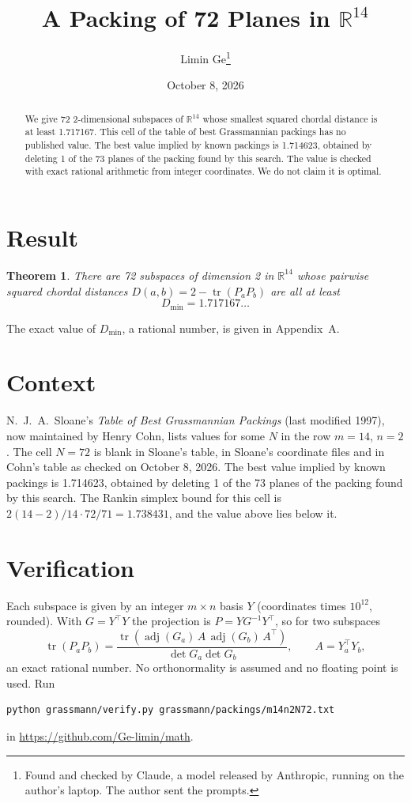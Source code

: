 \documentclass[11pt,a4paper]{article}
\title{A Packing of 72 Planes in $\mathbb{R}^{14}$}
\author{Limin Ge\thanks{Found and checked by Claude, a model released by Anthropic, running on the author's laptop. The author sent the prompts.}}
\date{October 8, 2026}
\newtheorem*{theorem}{Theorem}
\begin{document}
\maketitle
\begin{abstract}
We give 72 2-dimensional subspaces of $\mathbb{R}^{14}$ whose smallest squared chordal distance is at least 1.717167. This cell of the table of best Grassmannian packings has no published value. The best value implied by known packings is 1.714623, obtained by deleting 1 of the 73 planes of the packing found by this search. The value is checked with exact rational arithmetic from integer coordinates. We do not claim it is optimal.
\end{abstract}

\section{Result}
\begin{theorem}
There are 72 subspaces of dimension 2 in $\mathbb{R}^{14}$ whose pairwise squared chordal distances $D(a,b) = 2 - \operatorname{tr}(P_aP_b)$ are all at least
\[ D_{\min} = 1.717167\ldots \]
\end{theorem}
The exact value of $D_{\min}$, a rational number, is given in Appendix~A.


\section{Context}
N.~J.~A.~Sloane's \emph{Table of Best Grassmannian Packings} (last modified 1997), now maintained by Henry Cohn, lists values for some $N$ in the row $m=14$, $n=2$. The cell $N=72$ is blank in Sloane's table, in Sloane's coordinate files and in Cohn's table as checked on October 8, 2026. The best value implied by known packings is 1.714623, obtained by deleting 1 of the 73 planes of the packing found by this search. The Rankin simplex bound for this cell is $2(14-2)/14\cdot 72/71 = 1.738431$, and the value above lies below it.


\section{Verification}
Each subspace is given by an integer $m\times n$ basis $Y$ (coordinates times $10^{12}$, rounded). With $G=Y^\top Y$ the projection is $P=YG^{-1}Y^\top$, so for two subspaces
\[ \operatorname{tr}(P_aP_b)=\frac{\operatorname{tr}(\operatorname{adj}(G_a)\,A\,\operatorname{adj}(G_b)\,A^\top)}{\det G_a\det G_b},\qquad A=Y_a^\top Y_b, \]
an exact rational number. No orthonormality is assumed and no floating point is used. Run
\begin{verbatim}
python grassmann/verify.py grassmann/packings/m14n2N72.txt
\end{verbatim}
in \url{https://github.com/Ge-limin/math}.
\end{document}
